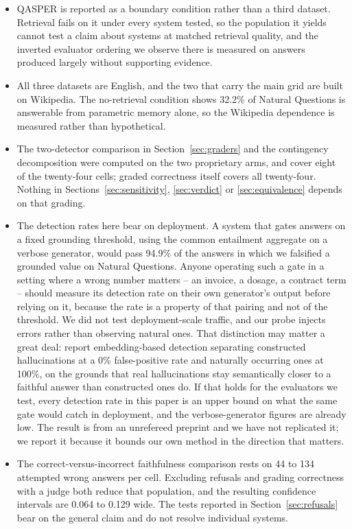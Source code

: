 \documentclass[11pt]{article}
\begin{document}
\begin{itemize}
\item QASPER is reported as a boundary condition rather than a third dataset. Retrieval fails on it under every system tested, so the population it yields cannot test a claim about systems at matched retrieval quality, and the inverted evaluator ordering we observe there is measured on answers produced largely without supporting evidence.

\item All three datasets are English, and the two that carry the main grid are built on Wikipedia. The no-retrieval condition shows 32.2\% of Natural Questions is answerable from parametric memory alone, so the Wikipedia dependence is measured rather than hypothetical.
\item The two-detector comparison in Section~\ref{sec:graders} and the contingency decomposition were computed on the two proprietary arms, and cover eight of the twenty-four cells; graded correctness itself covers all twenty-four. Nothing in Sections~\ref{sec:sensitivity}, \ref{sec:verdict} or \ref{sec:equivalence} depends on that grading.

\item The detection rates here bear on deployment. A system that gates answers on a fixed grounding threshold, using the common entailment aggregate on a verbose generator, would pass 94.9\% of the answers in which we falsified a grounded value on Natural Questions. Anyone operating such a gate in a setting where a wrong number matters -- an invoice, a dosage, a contract term -- should measure its detection rate on their own generator's output before relying on it, because the rate is a property of that pairing and not of the threshold. We did not test deployment-scale traffic, and our probe injects errors rather than observing natural ones. That distinction may matter a great deal: \citet{sinha-2025} report embedding-based detection separating constructed hallucinations at a 0\% false-positive rate and naturally occurring ones at 100\%, on the grounds that real hallucinations stay semantically closer to a faithful answer than constructed ones do. If that holds for the evaluators we test, every detection rate in this paper is an upper bound on what the same gate would catch in deployment, and the verbose-generator figures are already low. The result is from an unrefereed preprint and we have not replicated it; we report it because it bounds our own method in the direction that matters.

\item The correct-versus-incorrect faithfulness comparison rests on 44 to 134 attempted wrong answers per cell. Excluding refusals and grading correctness with a judge both reduce that population, and the resulting confidence intervals are 0.064 to 0.129 wide. The tests reported in Section~\ref{sec:refusals} bear on the general claim and do not resolve individual systems.
\end{itemize}
\end{document}
